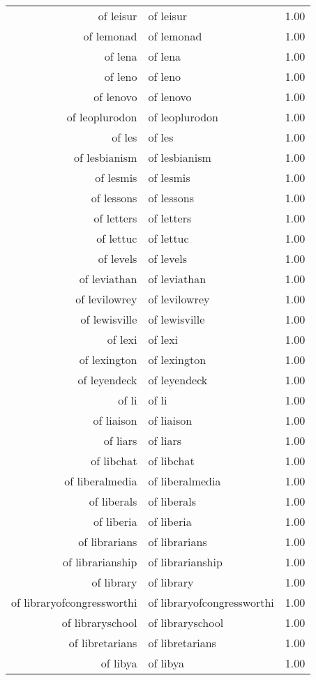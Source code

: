 \begin{table}[ht]
\begin{tabular}{rlr}
  of leisur & of leisur & 1.00 \\ 
  of lemonad & of lemonad & 1.00 \\ 
  of lena & of lena & 1.00 \\ 
  of leno & of leno & 1.00 \\ 
  of lenovo & of lenovo & 1.00 \\ 
  of leoplurodon & of leoplurodon & 1.00 \\ 
  of les & of les & 1.00 \\ 
  of lesbianism & of lesbianism & 1.00 \\ 
  of lesmis & of lesmis & 1.00 \\ 
  of lessons & of lessons & 1.00 \\ 
  of letters & of letters & 1.00 \\ 
  of lettuc & of lettuc & 1.00 \\ 
  of levels & of levels & 1.00 \\ 
  of leviathan & of leviathan & 1.00 \\ 
  of levilowrey & of levilowrey & 1.00 \\ 
  of lewisville & of lewisville & 1.00 \\ 
  of lexi & of lexi & 1.00 \\ 
  of lexington & of lexington & 1.00 \\ 
  of leyendeck & of leyendeck & 1.00 \\ 
  of li & of li & 1.00 \\ 
  of liaison & of liaison & 1.00 \\ 
  of liars & of liars & 1.00 \\ 
  of libchat & of libchat & 1.00 \\ 
  of liberalmedia & of liberalmedia & 1.00 \\ 
  of liberals & of liberals & 1.00 \\ 
  of liberia & of liberia & 1.00 \\ 
  of librarians & of librarians & 1.00 \\ 
  of librarianship & of librarianship & 1.00 \\ 
  of library & of library & 1.00 \\ 
  of libraryofcongressworthi & of libraryofcongressworthi & 1.00 \\ 
  of libraryschool & of libraryschool & 1.00 \\ 
  of libretarians & of libretarians & 1.00 \\ 
  of libya & of libya & 1.00 \\ 

\end{tabular}
\end{table}
